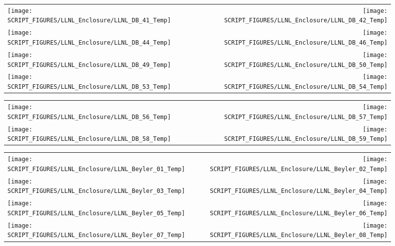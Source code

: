 \begin{figure}[p]
\begin{tabular*}{\textwidth}{l@{\extracolsep{\fill}}r}
\texttt{[image: SCRIPT\_FIGURES/LLNL\_Enclosure/LLNL\_DB\_41\_Temp]} &
\texttt{[image: SCRIPT\_FIGURES/LLNL\_Enclosure/LLNL\_DB\_42\_Temp]} \\
\texttt{[image: SCRIPT\_FIGURES/LLNL\_Enclosure/LLNL\_DB\_44\_Temp]} &
\texttt{[image: SCRIPT\_FIGURES/LLNL\_Enclosure/LLNL\_DB\_46\_Temp]} \\
\texttt{[image: SCRIPT\_FIGURES/LLNL\_Enclosure/LLNL\_DB\_49\_Temp]} &
\texttt{[image: SCRIPT\_FIGURES/LLNL\_Enclosure/LLNL\_DB\_50\_Temp]} \\
\texttt{[image: SCRIPT\_FIGURES/LLNL\_Enclosure/LLNL\_DB\_53\_Temp]} &
\texttt{[image: SCRIPT\_FIGURES/LLNL\_Enclosure/LLNL\_DB\_54\_Temp]}
\end{tabular*}
\end{figure}

\begin{figure}[p]
\begin{tabular*}{\textwidth}{l@{\extracolsep{\fill}}r}
\texttt{[image: SCRIPT\_FIGURES/LLNL\_Enclosure/LLNL\_DB\_56\_Temp]} &
\texttt{[image: SCRIPT\_FIGURES/LLNL\_Enclosure/LLNL\_DB\_57\_Temp]} \\
\texttt{[image: SCRIPT\_FIGURES/LLNL\_Enclosure/LLNL\_DB\_58\_Temp]} &
\texttt{[image: SCRIPT\_FIGURES/LLNL\_Enclosure/LLNL\_DB\_59\_Temp]}
\end{tabular*}
\end{figure}

\begin{figure}[p]
\begin{tabular*}{\textwidth}{l@{\extracolsep{\fill}}r}
\texttt{[image: SCRIPT\_FIGURES/LLNL\_Enclosure/LLNL\_Beyler\_01\_Temp]} &
\texttt{[image: SCRIPT\_FIGURES/LLNL\_Enclosure/LLNL\_Beyler\_02\_Temp]} \\
\texttt{[image: SCRIPT\_FIGURES/LLNL\_Enclosure/LLNL\_Beyler\_03\_Temp]} &
\texttt{[image: SCRIPT\_FIGURES/LLNL\_Enclosure/LLNL\_Beyler\_04\_Temp]} \\
\texttt{[image: SCRIPT\_FIGURES/LLNL\_Enclosure/LLNL\_Beyler\_05\_Temp]} &
\texttt{[image: SCRIPT\_FIGURES/LLNL\_Enclosure/LLNL\_Beyler\_06\_Temp]} \\
\texttt{[image: SCRIPT\_FIGURES/LLNL\_Enclosure/LLNL\_Beyler\_07\_Temp]} &
\texttt{[image: SCRIPT\_FIGURES/LLNL\_Enclosure/LLNL\_Beyler\_08\_Temp]}
\end{tabular*}
\end{figure}

